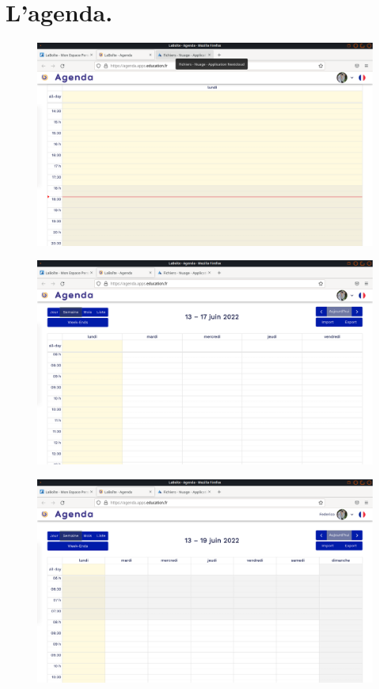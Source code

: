 \chapter{L'agenda.}

\begin{figure}
    \centering
    \includegraphics{Captures/agenda.jour.png}
\end{figure}

\begin{figure}
    \centering
    \includegraphics{Captures/agenda.semaine.png}
\end{figure}

\begin{figure}
    \centering
    \includegraphics{Captures/agenda.semaine.we.png}
\end{figure}

